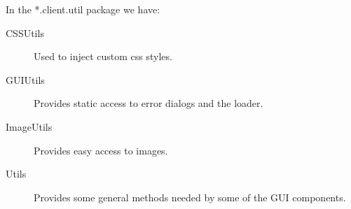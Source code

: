  In the *.client.util package we have:
 \begin{description}
  \item[CSSUtils] Used to inject custom css styles.
  \item[GUIUtils] Provides static access to error dialogs and the loader.
    \item[ImageUtils] Provides easy access to images.
    \item[Utils] Provides some general methods needed by some of the GUI components.
\end{description}





